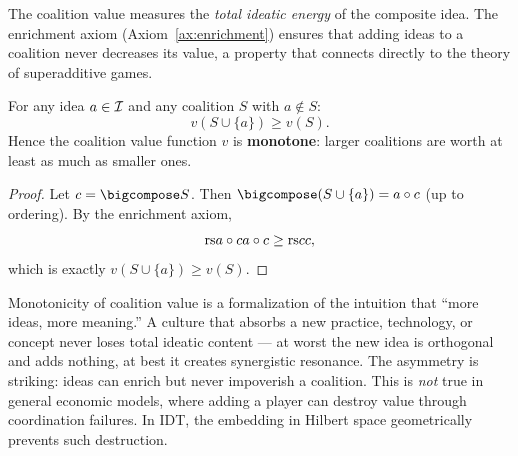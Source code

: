 The coalition value measures the \emph{total ideatic energy} of the composite
idea.  The enrichment axiom (Axiom~\ref{ax:enrichment}) ensures that adding
ideas to a coalition never decreases its value, a property that connects
directly to the theory of superadditive games.

\begin{theorem}
\label{thm:enrichment-superadditive}
For any idea $a \in \mathcal{I}$ and any coalition $S$ with $a \notin S$:
\[
  v(S \cup \{a\}) \geq v(S).
\]
Hence the coalition value function $v$ is \textbf{monotone}: larger coalitions
are worth at least as much as smaller ones.
\end{theorem}

\begin{proof}
Let $c = \bigcompose S$.  Then $\bigcompose (S \cup \{a\}) = a \compose c$
(up to ordering).  By the enrichment axiom,
\[
  \mathrm{rs}{a \circ c}{a \circ c} \geq \mathrm{rs}{c}{c},
\]
which is exactly $v(S \cup \{a\}) \geq v(S)$.
\end{proof}

\begin{interpretation}
Monotonicity of coalition value is a formalization of the intuition that
``more ideas, more meaning.''  A culture that absorbs a new practice,
technology, or concept never loses total ideatic content --- at worst the new
idea is orthogonal and adds nothing, at best it creates synergistic resonance.
The asymmetry is striking: ideas can enrich but never impoverish a coalition.
This is \emph{not} true in general economic models, where adding a player can
destroy value through coordination failures.  In IDT, the embedding in Hilbert
space geometrically prevents such destruction.
\end{interpretation}

